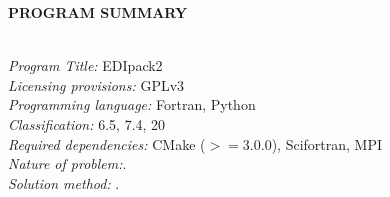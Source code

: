 \documentclass[preprint,3p,10pt]{elsarticle}
\begin{document}
\noindent
{\bf PROGRAM SUMMARY}
\begin{small}
  \noindent
  \\
  {\em Program Title:}  EDIpack2                                        \\
{\em Licensing provisions:} GPLv3\\
{\em Programming language:}  Fortran, Python \\
{\em Classification:} 6.5, 7.4, 20 \\
{\em Required dependencies:} CMake ($>=3.0.0$), Scifortran, MPI\\
{\em Nature of problem:}. \\
{\em Solution method:} .\\
\end{small}


\tableofcontents




















\end{document}
